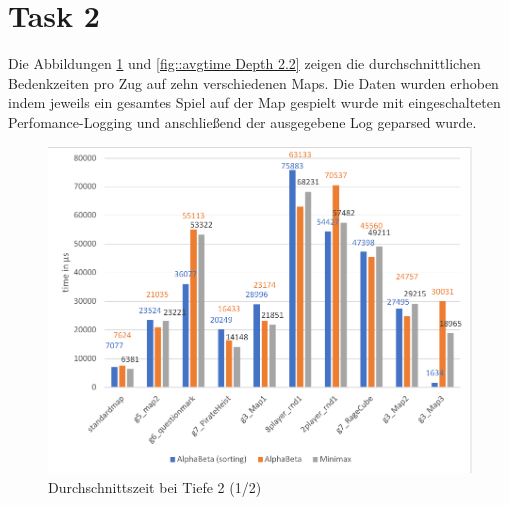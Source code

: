 \section{Task 2}
Die Abbildungen \ref{fig::avgtime Depth2.1} und \ref{fig::avgtime Depth 2.2} zeigen die durchschnittlichen Bedenkzeiten pro Zug auf zehn verschiedenen Maps. Die Daten wurden erhoben indem jeweils ein gesamtes Spiel auf der Map gespielt wurde mit eingeschalteten Perfomance-Logging und anschließend der ausgegebene Log geparsed wurde.
\begin{figure}[h]
	\begin{center}
		\includegraphics{Depth_2_1_avgtime.pdf}
		\caption{Durchschnittszeit bei Tiefe 2 (1/2)}
		\label{fig::avgtime Depth2.1}
	\end{center}
\end{figure}
